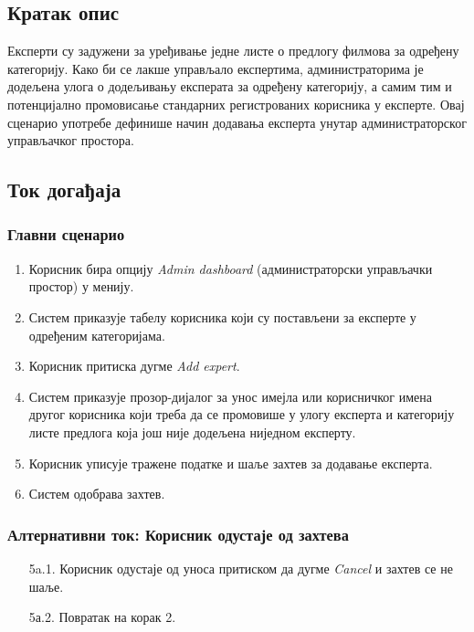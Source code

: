 \subsection{Кратак опис}

Експерти су задужени за уређивање једне листе о предлогу филмова за одређену категорију. Како
би се лакше управљало експертима, администраторима је додељена улога о додељивању експерата за
одређену категорију, а самим тим и потенцијално промовисање стандарних регистрованих корисника
у експерте. Овај сценарио употребе дефинише начин додавања експерта унутар администраторског
управљачког простора.

\subsection{Ток догађаја}

\subsubsection{Главни сценарио}

\begin{enumerate}
    \item Корисник бира опцију \textit{Admin dashboard} (администраторски управљачки простор) у менију.
    \item Систем приказује табелу корисника који су постављени за експерте у одређеним категоријама.
    \item Корисник притиска дугме \textit{Add expert}.
    \item Систем приказује прозор-дијалог за унос имејла или корисничког имена другог корисника
      који треба да се промовише у улогу експерта и категорију листе предлога која још није
      додељена ниједном експерту.
    \item Корисник уписује тражене податке и шаље захтев за додавање експерта.
    \item Систем одобрава захтев.
\end{enumerate}

\subsubsection{Алтернативни ток: Корисник одустаје од захтева}

\begin{enumerate}
    \item [5a.1.] Корисник одустаје од уноса притиском да дугме \textit{Cancel} и захтев се не шаље.
    \item [5а.2.] Повратак на корак 2.
\end{enumerate}

